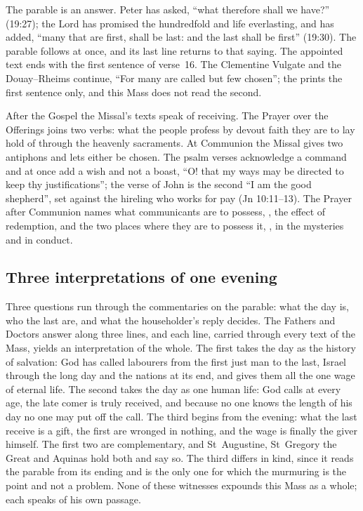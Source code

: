 The parable is an answer. Peter has asked, ``what therefore shall we have?''
(19:27); the Lord has promised the hundredfold and life everlasting, and has
added, ``many that are first, shall be last: and the last shall be first''
(19:30). The parable follows at once, and its last line returns to that
saying. The appointed text ends with the first sentence of verse~16. The
Clementine Vulgate and the Douay--Rheims continue, ``For many are called but
few chosen''; the  prints the first sentence only, and this
Mass does not read the second.

After the Gospel the Missal's texts speak of receiving. The Prayer over the
Offerings joins two verbs: what the people profess by devout faith they are to
lay hold of through the heavenly sacraments. At Communion the Missal gives two
antiphons and lets either be chosen. The psalm verses acknowledge a command
and at once add a wish and not a boast, ``O! that my ways may be directed to
keep thy justifications''; the verse of John is the second ``I am the good
shepherd'', set against the hireling who works for pay (Jn 10:11--13). The Prayer after Communion names what communicants
are to possess, , the effect of redemption, and
the two places where they are to possess it, , in the mysteries and in conduct.

\subsection{Three interpretations of one evening}

Three questions run through the commentaries on the parable: what the day is,
who the last are, and what the householder's reply decides. The Fathers and
Doctors answer along three lines, and each line, carried through every text of
the Mass, yields an interpretation of the whole. The first takes the day as
the history of salvation: God has called labourers from the first just man to
the last, Israel through the long day and the nations at its end, and gives
them all the one wage of eternal life. The second
takes the day as one human life: God calls at every age, the late comer is
truly received, and because no one knows the length of his day no one may put
off the call. The third begins from the evening: what the last receive is a
gift, the first are wronged in nothing, and the wage is finally the giver
himself. The first two are complementary, and St~Augustine, St~Gregory the
Great and Aquinas hold both and say so. The third differs in kind, since it
reads the parable from its ending and is the only one for which the murmuring
is the point and not a problem. None of these witnesses expounds this Mass as
a whole; each speaks of his own passage.
